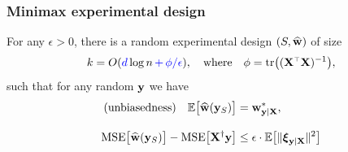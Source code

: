 \documentclass{beamer}
\begin{document}
  \begin{frame}
    \frametitle{Minimax experimental design}
    \begin{theorem}
For any $\epsilon>0$, there is a random experimental design $(S,\widehat{\mathbf w})$
of size
\[k=O(\Blue{d}\log n\Blue{\,+\,\phi/\epsilon}), \quad\text{where}\quad\phi=\tr\big((\X^\top\X)^{-1}\big),\]
such that for any random $\mathbf y$ we have
\begin{align*}
\text{(unbiasedness)}\quad  \E\big[\wbh(\y_S)\big]&= \w^*_{\y|\X},\\[3mm]
\mathrm{MSE}\big[\wbh(\y_S)\big] - \mathrm{MSE}\big[\X^\dagger\y\big]
  &\leq \epsilon\cdot 
  \E\big[\|\xib_{\y|\X}\|^2\big]%
\end{align*}
\end{theorem}

  
\end{frame}
\end{document}
